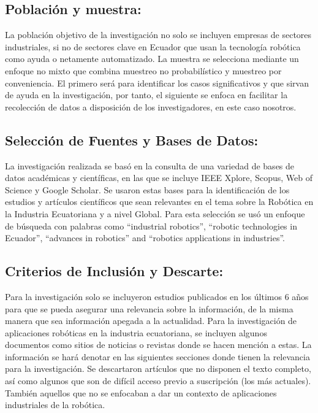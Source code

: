 \documentclass[conference]{IEEEtran}
\begin{document}
\subsection{Población y muestra:}

La población objetivo de la investigación no solo se incluyen empresas de sectores industriales, si no de sectores clave en Ecuador que usan la tecnología robótica como ayuda o netamente automatizado. La muestra se selecciona mediante un enfoque no mixto que combina muestreo no probabilístico y muestreo por conveniencia. El primero será para identificar los casos significativos y que sirvan de ayuda en la investigación, por tanto, el siguiente se enfoca en facilitar la recolección de datos a disposición de los investigadores, en este caso nosotros.

\subsection{Selección de Fuentes y Bases de Datos:}

La investigación realizada se basó en la consulta de una variedad de bases de datos académicas y científicas, en las que se incluye IEEE Xplore, Scopus, Web of Science y Google Scholar. Se usaron estas bases para la identificación de los estudios y artículos científicos que sean relevantes en el tema sobre la Robótica en la Industria Ecuatoriana y a nivel Global. Para esta selección se usó un enfoque de búsqueda con palabras como “industrial robotics”, “robotic technologies in Ecuador”, “advances in robotics” and “robotics applications in industries”.

\subsection{Criterios de Inclusión y Descarte:}

Para la investigación solo se incluyeron estudios publicados en los últimos 6 años para que se pueda asegurar una relevancia sobre la información, de la misma manera que sea información apegada a la actualidad. Para la investigación de aplicaciones robóticas en la industria ecuatoriana, se incluyen algunos documentos como sitios de noticias o revistas donde se hacen mención a estas. La información se hará denotar en las siguientes secciones donde tienen la relevancia para la investigación. Se descartaron artículos que no disponen el texto completo, así como algunos que son de difícil acceso previo a suscripción (los más actuales). También aquellos que no se enfocaban a dar un contexto de aplicaciones industriales de la robótica.
\end{document}
